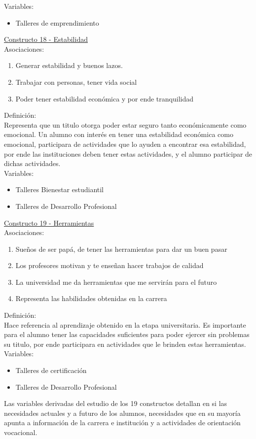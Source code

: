 Variables:
\begin{itemize}
	\item Talleres de emprendimiento	
\end{itemize} 

\underline {Constructo 18 - Estabilidad} \\
Asociaciones:
\begin{enumerate}
	\item Generar estabilidad y buenos lazos.
	\item Trabajar con personas, tener vida social 	
	\item Poder tener estabilidad económica y por ende tranquilidad
\end{enumerate}

Definición:\\
Representa que un titulo otorga poder estar seguro tanto económicamente como emocional. Un alumno con interés en tener una estabilidad económica como emocional, participara de actividades que lo ayuden a encontrar esa estabilidad, por ende las instituciones deben tener estas actividades, y el alumno participar de dichas actividades.\\

Variables:
\begin{itemize}
	\item Talleres Bienestar estudiantil
	\item Talleres de Desarrollo Profesional	
\end{itemize} 


\underline {Constructo 19 - Herramientas} \\
Asociaciones:
\begin{enumerate}
	\item Sueños de ser papá, de tener las herramientas para dar un buen pasar
	\item Los profesores motivan y te enseñan hacer trabajos de calidad	
	\item La universidad me da herramientas que me servirán para el futuro
	\item Representa las habilidades obtenidas en la carrera
\end{enumerate}

Definición:\\
Hace referencia al aprendizaje obtenido en la etapa universitaria. Es importante para el alumno tener las capacidades suficientes para poder ejercer sin problemas su titulo, por ende participara en actividades que le brinden estas herramientas.\\

Variables:
\begin{itemize}
	\item Talleres de certificación
	\item Talleres de Desarrollo Profesional	
\end{itemize} 

Las variables derivadas del estudio de los 19 constructos detallan en si las necesidades actuales y a futuro de los alumnos, necesidades que en su mayoría apunta a información de la carrera e institución y a actividades de orientación vocacional.\\